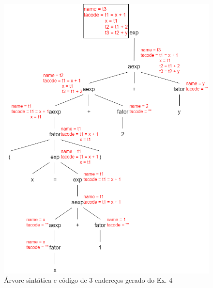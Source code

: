 \documentclass{article}
\begin{document}
\begin{figure}[ht!]
	\centering
	\includegraphics[width=0.8\linewidth]{p2/Q4}
	\caption{Árvore sintática e código de 3 endereços gerado do Ex. 4}
	\label{fig:Q4}
\end{figure}
\end{document}
